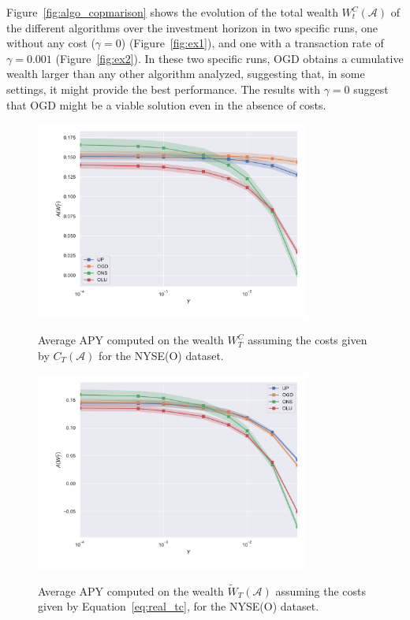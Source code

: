 Figure~\ref{fig:algo_copmarison} shows the evolution of the total wealth ${W}^C_t(\mathcal{A})$ of the different algorithms over the investment horizon in two specific runs, one without any cost ($\gamma = 0$) (Figure~\ref{fig:ex1}), and one with a transaction rate of $\gamma = 0.001$ (Figure~\ref{fig:ex2}).
In these two specific runs, OGD obtains a cumulative wealth larger than any other algorithm analyzed, suggesting that, in some settings, it might provide the best performance.
The results with $\gamma = 0$ suggest that OGD might be a viable solution even in the absence of costs.


\begin{figure}[ht!]
\centering
{\includegraphics[width=0.80\textwidth,keepaspectratio]{img/fig_w_decay_l1.pdf}} 
\caption{Average APY computed on the wealth $W_T^C$ assuming the costs given by $C_T(\mathcal{A})$ for the NYSE(O) dataset.}
\label{fig:wealth_decay_l1}
\end{figure}

\begin{figure}[ht!]
\centering
{\includegraphics[width=0.80\textwidth,keepaspectratio]{img/fig_w_decay_true.pdf}} 
\caption{ Average APY computed on the wealth $\tilde{W}_T(\mathcal A)$ assuming the costs given by Equation~\eqref{eq:real_tc}, for the NYSE(O) dataset.}
\label{fig:wealth_decay_true}
\end{figure}

